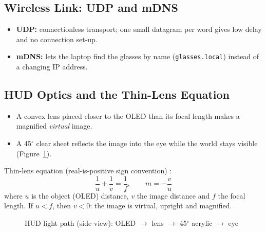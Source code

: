 \documentclass[12pt,a4paper]{report}
\begin{document}
\subsection{Wireless Link: UDP and mDNS}
\begin{itemize}
  \item \textbf{UDP:} connectionless transport; one small datagram per word gives low delay and no connection set-up.
  \item \textbf{mDNS:} lets the laptop find the glasses by name (\texttt{glasses.local}) instead of a changing IP address.
\end{itemize}

\subsection{HUD Optics and the Thin-Lens Equation}
\begin{itemize}
  \item A convex lens placed closer to the OLED than its focal length makes a magnified \emph{virtual} image.
  \item A 45$^\circ$ clear sheet reflects the image into the eye while the world stays visible (Figure~\ref{fig:optics}).
\end{itemize}

Thin-lens equation (real-is-positive sign convention) \cite{hecht}:
\begin{equation}
\frac{1}{u} + \frac{1}{v} = \frac{1}{f}, \qquad m = -\frac{v}{u}
\label{eq:lens}
\end{equation}
where $u$ is the object (OLED) distance, $v$ the image distance and $f$ the focal length. If $u < f$, then $v < 0$: the image is virtual, upright and magnified.

\begin{figure}[H]
\centering
{}
\caption{HUD light path (side view): OLED $\rightarrow$ lens $\rightarrow$ 45$^\circ$ acrylic $\rightarrow$ eye}
\label{fig:optics}
\end{figure}
\end{document}
